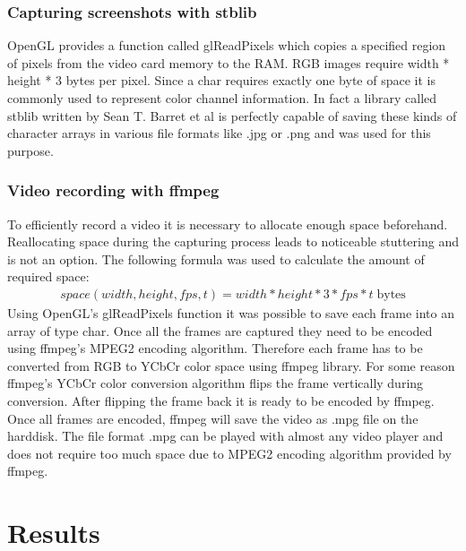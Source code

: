 \documentclass[11pt,a4paper,twoside,openright]{report}
\begin{document}
\subsection{Capturing screenshots with stblib}
OpenGL provides a function called glReadPixels which copies a specified region of pixels from the video card memory to the RAM. RGB images require width * height * 3 bytes per pixel. Since a char requires exactly one byte of space it is commonly used to represent color channel information. In fact a library called stblib written by Sean T. Barret et al is perfectly capable of saving these kinds of character arrays in various file formats like .jpg or .png and was used for this purpose.

\subsection{Video recording with ffmpeg}
To efficiently record a video it is necessary to allocate enough space beforehand. Reallocating space during the capturing process leads to noticeable stuttering and is not an option. The following formula was used to calculate the amount of required space:
\begin{align*}
space(width, height, fps, t) = width * height * 3 * fps * t \; \mathrm{bytes}
\end{align*}
Using OpenGL's glReadPixels function it was possible to save each frame into an array of type char. Once all the frames are captured they need to be encoded using ffmpeg's MPEG2 encoding algorithm. Therefore each frame has to be converted from RGB to YCbCr color space using ffmpeg library. For some reason ffmpeg's YCbCr color conversion algorithm flips the frame vertically during conversion. After flipping the frame back it is ready to be encoded by ffmpeg. Once all frames are encoded, ffmpeg will save the video as .mpg file on the harddisk. The file format .mpg can be played with almost any video player and does not require too much space due to MPEG2 encoding algorithm provided by ffmpeg.

\chapter{Results}
\label{sec:results}
\end{document}
